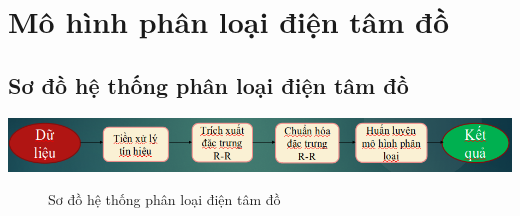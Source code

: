 \chapter{Mô hình phân loại điện tâm đồ }
\newpage

\section{Sơ đồ hệ thống phân loại điện tâm đồ}
\begin{center}
    \includegraphics[scale=.5]{image/chapter5/system.png}
    \begin{figure}[htp]
    \begin{center}
    \end{center}
    \caption{Sơ đồ hệ thống phân loại điện tâm đồ}
    \end{figure}
\end{center}

